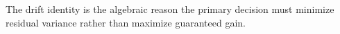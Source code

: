 The drift identity is the algebraic reason the primary decision must minimize residual variance rather than maximize guaranteed gain.